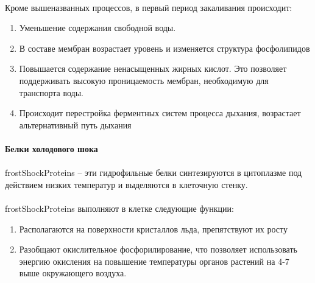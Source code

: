 \paragraph*{}Кроме вышеназванных процессов, в первый период закаливания происходит:

\begin{enumerate}
\item Уменьшение содержания свободной воды. 
\item В составе мембран возрастает уровень и изменяется структура фосфолипидов
\item Повышается содержание ненасыщенных жирных кислот. Это позволяет поддерживать высокую проницаемость мембран, необходимую для транспорта воды. 
\item Происходит перестройка ферментных систем процесса дыхания, возрастает альтернативный путь дыхания

\end{enumerate}

\paragraph*{Белки холодового шока}

\paragraph*{}\gls{frostShockProteins} -- эти гидрофильные белки синтезируются в цитоплазме под действием низких температур и выделяются в клеточную стенку. 
\paragraph*{}\gls{frostShockProteins} выполняют в клетке следующие функции:

\begin{enumerate}
\item Располагаются на поверхности кристаллов льда, препятствуют их росту
\item Разобщают окислительное фосфорилирование, что позволяет использовать энергию окисления на повышение температуры органов растений на 4-7~ \celsius~ выше окружающего воздуха.
\end{enumerate} 




